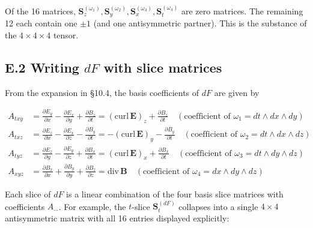 Of the 16 matrices,
\(\mathbf{S}_{z}^{(\omega_1)}, \mathbf{S}_{y}^{(\omega_2)}, \mathbf{S}_{x}^{(\omega_3)}, \mathbf{S}_{t}^{(\omega_4)}\)
are zero matrices. The remaining 12 each contain one \(\pm1\) (and one
antisymmetric partner). This is the substance of the \(4\times4\times4\)
tensor.

\hypertarget{e.2-writing-df-with-slice-matrices}{%
\subsection{\texorpdfstring{E.2 Writing \(dF\) with slice
matrices}{E.2 Writing dF with slice matrices}}\label{e.2-writing-df-with-slice-matrices}}

From the expansion in §10.4, the basis coefficients of \(dF\) are given
by

\[
\begin{aligned}
A_{txy} &= \frac{\partial E_y}{\partial x} - \frac{\partial E_x}{\partial y} + \frac{\partial B_z}{\partial t} = (\mathrm{curl}\,\mathbf{E})_z + \frac{\partial B_z}{\partial t}
\quad (\text{coefficient of } \omega_1 = dt\wedge dx\wedge dy) \\[6pt]
A_{txz} &= \frac{\partial E_z}{\partial x} - \frac{\partial E_x}{\partial z} - \frac{\partial B_y}{\partial t} = -(\mathrm{curl}\,\mathbf{E})_y - \frac{\partial B_y}{\partial t}
\quad (\text{coefficient of } \omega_2 = dt\wedge dx\wedge dz) \\[6pt]
A_{tyz} &= \frac{\partial E_z}{\partial y} - \frac{\partial E_y}{\partial z} + \frac{\partial B_x}{\partial t} = (\mathrm{curl}\,\mathbf{E})_x + \frac{\partial B_x}{\partial t}
\quad (\text{coefficient of } \omega_3 = dt\wedge dy\wedge dz) \\[6pt]
A_{xyz} &= \frac{\partial B_x}{\partial x} + \frac{\partial B_y}{\partial y} + \frac{\partial B_z}{\partial z} = \mathrm{div}\,\mathbf{B}
\quad (\text{coefficient of } \omega_4 = dx\wedge dy\wedge dz)
\end{aligned}
\]

Each slice of \(dF\) is a linear combination of the four basis slice
matrices with coefficients \(A_{\cdots}\). For example, the \(t\)-slice
\(\mathbf{S}_{t}^{(dF)}\) collapses into a single \(4\times4\)
antisymmetric matrix with all 16 entries displayed explicitly:

